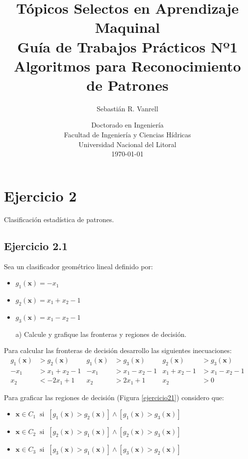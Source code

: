 \documentclass[11pt,a4paper,final]{article}
\author{Sebastián R. Vanrell\\[3em]}
\title{{\Large Tópicos Selectos en Aprendizaje Maquinal}\\[3em]
       \textsf{Guía de Trabajos Prácticos Nº1}\\\bigskip
       \textsf{Algoritmos para Reconocimiento de Patrones}\\[3em]}
\date{Doctorado en Ingeniería\\\bigskip
      Facultad de Ingeniería y Ciencias Hídricas\\\bigskip
      Universidad Nacional del Litoral \\[5em]
      \today}
\begin{document}
\renewcommand{\tablename}{Tabla}

\maketitle
\newpage

\tableofcontents

\newpage

\section{Ejercicio 2}

Clasificación estadística de patrones.

\subsection{Ejercicio 2.1}

Sea un clasificador geométrico lineal definido por:
\begin{itemize}
\item $g_1(\mathbf{x}) = - x_1$ 
\item $g_2(\mathbf{x}) = x_1 + x_2 - 1$
\item $g_3(\mathbf{x}) = x_1 - x_2 - 1$
\end{itemize}
\begin{enumerate}
\item[a)] Calcule y grafique las fronteras y regiones de decisión.
\end{enumerate}

Para calcular las fronteras de decisión desarrollo las siguientes inecuaciones:
\begin{align*}
g_1(\mathbf{x}) &> g_2(\mathbf{x})   &  g_1(\mathbf{x}) &> g_3(\mathbf{x})  &  g_2(\mathbf{x}) &> g_3(\mathbf{x}) \\
- x_1           &> x_1 + x_2 - 1     &  - x_1           &> x_1 - x_2 - 1    &  x_1 + x_2 - 1   &> x_1 - x_2 - 1   \\
  x_2           &< - 2 x_1 + 1       &  x_2             &> 2 x_1 + 1        &  x_2             &> 0
\end{align*}

Para graficar las regiones de decisión (Figura \ref{ejercicio21}) considero que:
\begin{itemize}
\item $\mathbf{x} \in C_1 \;\; \mathrm{si} \;\; [g_1(\mathbf{x}) > g_2(\mathbf{x})] \wedge  [g_1(\mathbf{x}) > g_3(\mathbf{x})]$

\item $\mathbf{x} \in C_2 \;\; \mathrm{si} \;\; [g_2(\mathbf{x}) > g_1(\mathbf{x})] \wedge  [g_2(\mathbf{x}) > g_3(\mathbf{x})]$

\item $\mathbf{x} \in C_3 \;\; \mathrm{si} \;\; [g_3(\mathbf{x}) > g_1(\mathbf{x})] \wedge  [g_3(\mathbf{x}) > g_2(\mathbf{x})]$
\end{itemize}
\end{document}
